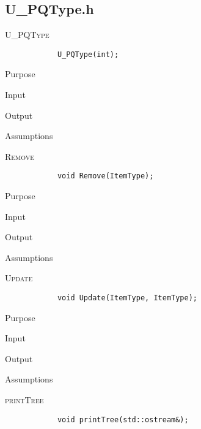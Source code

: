 \documentclass[pdftex, 12pt]{article}
\begin{document}
\subsection{U_PQType.h}
\begin{description}

	\item{\textsc{U_PQType}}
		\begin{lstlisting}
			U_PQType(int);
		\end{lstlisting}
		\begin{description}

			\item{Purpose}

			\item{Input}

			\item{Output}

			\item{Assumptions}

		\end{description}
	\item{\textsc{Remove}}
		\begin{lstlisting}
			void Remove(ItemType);
		\end{lstlisting}
		\begin{description}

			\item{Purpose}

			\item{Input}

			\item{Output}

			\item{Assumptions}

		\end{description}
	\item{\textsc{Update}}
		\begin{lstlisting}
			void Update(ItemType, ItemType);
		\end{lstlisting}
		\begin{description}

			\item{Purpose}

			\item{Input}

			\item{Output}

			\item{Assumptions}

		\end{description}
	\item{\textsc{printTree}}
		\begin{lstlisting}
			void printTree(std::ostream&);
		\end{lstlisting}
		\begin{description}


\end{description}
\end{description}
\end{document}
